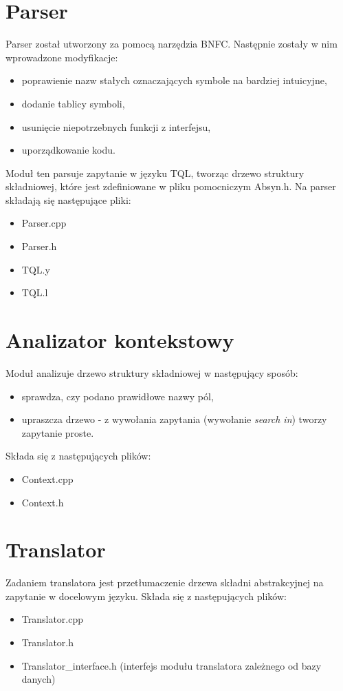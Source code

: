 \section{Parser}
Parser został utworzony za pomocą narzędzia BNFC. Następnie zostały w nim wprowadzone modyfikacje:
\begin{itemize}
\item poprawienie nazw stałych oznaczających symbole na bardziej intuicyjne,
\item dodanie tablicy symboli,
\item usunięcie niepotrzebnych funkcji z interfejsu,
\item uporządkowanie kodu.
\end{itemize}
Moduł ten parsuje zapytanie w języku TQL, tworząc drzewo struktury składniowej, które jest zdefiniowane w pliku pomocniczym Absyn.h.
Na parser składają się następujące pliki:
\begin{itemize}
 \item Parser.cpp
 \item Parser.h
 \item TQL.y %
 \item TQL.l %
\end{itemize}

\section{Analizator kontekstowy}
Moduł analizuje drzewo struktury składniowej w następujący sposób:
\begin{itemize}
 \item sprawdza, czy podano prawidłowe nazwy pól,  %
\item upraszcza drzewo - z wywołania zapytania (wywołanie \textit{search in}) tworzy zapytanie proste.
\end{itemize}
Składa się z następujących plików:
\begin{itemize}
 \item Context.cpp
 \item Context.h
\end{itemize}

\section{Translator}
Zadaniem translatora jest przetłumaczenie drzewa składni abstrakcyjnej na zapytanie w docelowym języku. 
Składa się z następujących plików:
\begin {itemize}
 \item Translator.cpp
 \item Translator.h
 \item Translator\_interface.h (interfejs modułu translatora zależnego od bazy danych)
\end {itemize}

